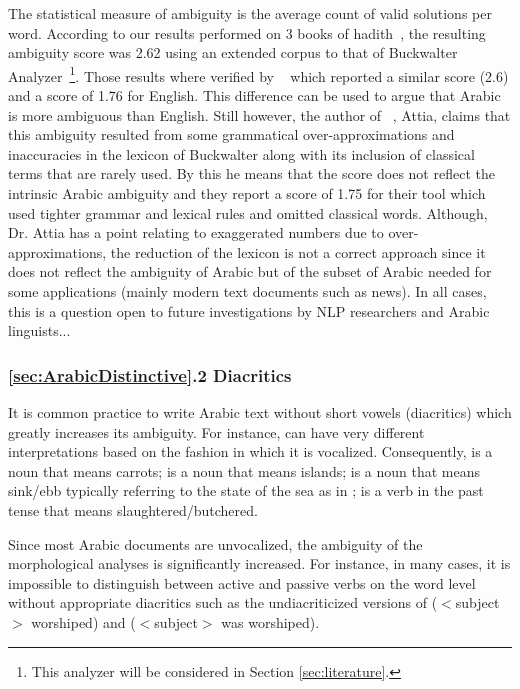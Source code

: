 \documentclass[a4,12pt]{report}
\newcommand{\noVocRL}[1]{\transtrue\novocalize\RL{#1}\vocalize}
\begin{document}
	The statistical measure of ambiguity is the average count of valid solutions per word. According to our results performed
	on 3 books of hadith~\cite{IbnHanbal,AlKulayni,AlTousi}, the resulting ambiguity score was 2.62 using an extended corpus to that of
	Buckwalter Analyzer~\cite{Buckwalter:02}\footnote{This analyzer will be considered in Section \ref{sec:literature}.}.
	Those results where verified by ~\cite{Attia:06b} which reported a similar score (2.6) and a score of 1.76 for English.
	This difference can be used to argue that Arabic is more ambiguous than English. Still however, the author of ~\cite{Attia:06b}, Attia,
	claims that this ambiguity resulted from some grammatical over-approximations and inaccuracies in the lexicon of Buckwalter along with
	its inclusion of classical terms that are rarely used. By this he means that the score does not reflect the intrinsic Arabic ambiguity and 
	they report a score of 1.75 for their tool which used tighter grammar and lexical rules and omitted classical words. Although, Dr. Attia
	has a point relating to exaggerated numbers due to over-approximations, the reduction of the lexicon is not a correct approach since it does
	not reflect the ambiguity of Arabic but of the subset of Arabic needed for some applications (mainly modern text documents such as news).
	In all cases, this is a question open to future investigations by NLP researchers and Arabic linguists...

\subsubsection{\ref*{sec:ArabicDistinctive}.2 Diacritics}

	It is common practice to write Arabic text without short vowels (diacritics) 
	which greatly increases its ambiguity. For instance, \noVocRL{jzr} can have very different interpretations based on 
	the fashion in which it is vocalized. Consequently, 
	 is a noun that means carrots; 
	 is a noun that means islands; 
	 is a noun that means sink/ebb typically referring to the state of the sea as in \noVocRL{Al-mad wAl-jazr};
	 is a verb in the past tense that means slaughtered/butchered.
	
	Since most Arabic documents are unvocalized, the ambiguity of the morphological analyses is significantly increased.
	For instance, in many cases, it is impossible to distinguish between active and passive verbs on the word level without
	appropriate diacritics such as the undiacriticized versions of  ($<$subject$>$ worshiped) and  ($<$subject$>$ was worshiped).
	
\end{document}
